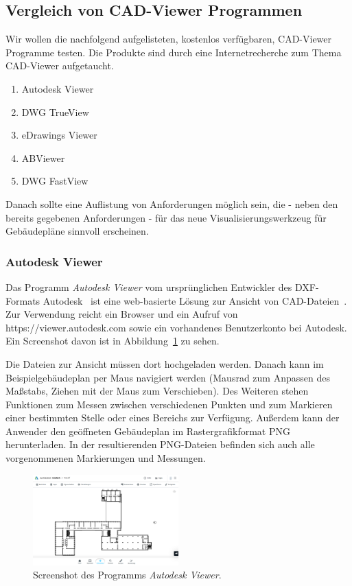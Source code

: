 \subsection{Vergleich von CAD-Viewer Programmen}
\label{subsec:comparison-cad-viewer}

Wir wollen die nachfolgend aufgelisteten, kostenlos verfügbaren, CAD-Viewer Programme testen.
Die Produkte sind durch eine Internetrecherche zum Thema CAD-Viewer aufgetaucht.

\begin{enumerate}
    \item Autodesk Viewer
    \item DWG TrueView
    \item eDrawings Viewer
    \item ABViewer
    \item DWG FastView
\end{enumerate}

Danach sollte eine Auflistung von Anforderungen möglich sein, die - neben den bereits gegebenen Anforderungen - für das neue Visualisierungswerkzeug für Gebäudepläne sinnvoll erscheinen.

\subsubsection{Autodesk Viewer}
\label{subsubsec:autodesk-viewer}

Das Programm \textit{Autodesk Viewer} vom ursprünglichen Entwickler des DXF-Formats Autodesk~\cite{DXFReference} ist eine web-basierte Lösung zur Ansicht von CAD-Dateien~\cite{AutodeskViewer}.
Zur Verwendung reicht ein Browser und ein Aufruf von https://viewer.autodesk.com sowie ein vorhandenes Benutzerkonto bei Autodesk.
Ein Screenshot davon ist in Abbildung~\ref{fig:autodesk-viewer} zu sehen.

Die Dateien zur Ansicht müssen dort hochgeladen werden.
Danach kann im Beispielgebäudeplan per Maus navigiert werden (Mausrad zum Anpassen des Maßstabs, Ziehen mit der Maus zum Verschieben).
Des Weiteren stehen Funktionen zum Messen zwischen verschiedenen Punkten und zum Markieren einer bestimmten Stelle oder eines Bereichs zur Verfügung.
Außerdem kann der Anwender den geöffneten Gebäudeplan im Rastergrafikformat PNG herunterladen.
In der resultierenden PNG-Dateien befinden sich auch alle vorgenommenen Markierungen und Messungen.

\begin{figure}
    \includegraphics[width=0.5\textwidth]{res/autodesk-viewer.png}
    \caption{Screenshot des Programms \textit{Autodesk Viewer}.}
    \label{fig:autodesk-viewer}
\end{figure}

